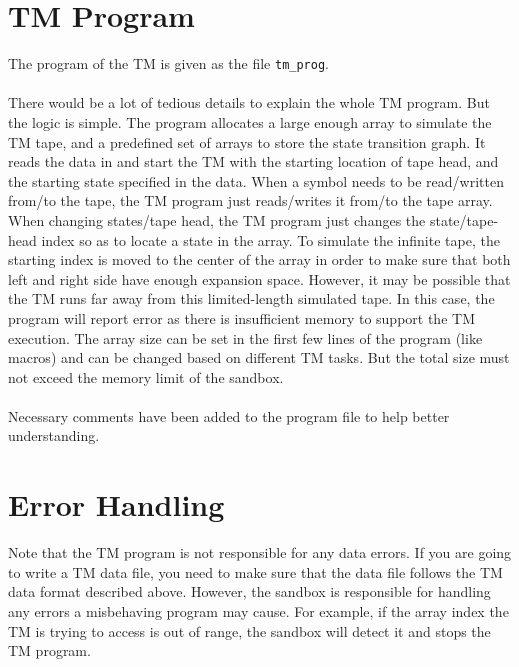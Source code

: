 \documentclass[11pt]{article}
\begin{document}
\section{TM Program}
The program of the TM is given as the file {\tt tm\_prog}. \\\\
There would be a lot of tedious details to explain the whole TM program. But the logic is simple. The program allocates a large enough array to simulate the TM tape, and a predefined set of arrays to store the state transition graph. It reads the data in and start the TM with the starting location of tape head, and the starting state specified in the data. When a symbol needs to be read/written from/to the tape, the TM program just reads/writes it from/to the tape array. When changing states/tape head, the TM program just changes the state/tape-head index so as to locate a state in the array. To simulate the infinite tape, the starting index is moved to the center of the array in order to make sure that both left and right side have enough expansion space. However, it may be possible that the TM runs far away from this limited-length simulated tape. In this case, the program will report error as there is insufficient memory to support the TM execution. The array size can be set in the first few lines of the program (like macros) and can be changed based on different TM tasks. But the total size must not exceed the memory limit of the sandbox. \\
\\
Necessary comments have been added to the program file to help better understanding. 

\section{Error Handling}
Note that the TM program is not responsible for any data errors. If you are going to write a TM data file, you need to make sure that the data file follows the TM data format described above. However, the sandbox is responsible for handling any errors a misbehaving program may cause. For example, if the array index the TM is trying to access is out of range, the sandbox will detect it and stops the TM program.
\end{document}
